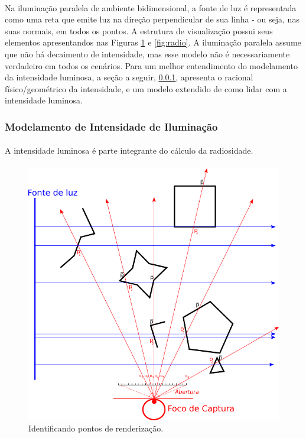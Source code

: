 \documentclass{article}
\begin{document}
	\paragraph{}
	Na iluminação paralela de ambiente bidimensional, a fonte de luz é representada como uma reta que emite luz na direção perpendicular de sua linha - ou seja, nas suas normais, em todos os pontos. A estrutura de visualização possui seus elementos apresentandos nas Figuras \ref{fig:rend} e \ref{fig:radio}. A iluminação paralela assume que não há decaimento de intensidade, mas esse modelo não é necessariamente verdadeiro em todos os cenários. Para um melhor entendimento do modelamento da intensidade luminosa, a seção a seguir, \ref{intensidade}, apresenta o racional físico/geométrico da intensidade, e um modelo extendido de como lidar com a intensidade luminosa.
	
	\subsubsection{Modelamento de Intensidade de Iluminação} \label{intensidade}
	
	\paragraph{}
	A intensidade luminosa é parte integrante do cálculo da radiosidade.
	
	\paragraph{}
		\begin{figure}[h]
		\centering
		\includegraphics[scale=0.8]{Renderizacao-2D-1D}
		\caption{Identificando pontos de renderização.}
		\label{fig:rend}
	\end{figure}
	
\end{document}
